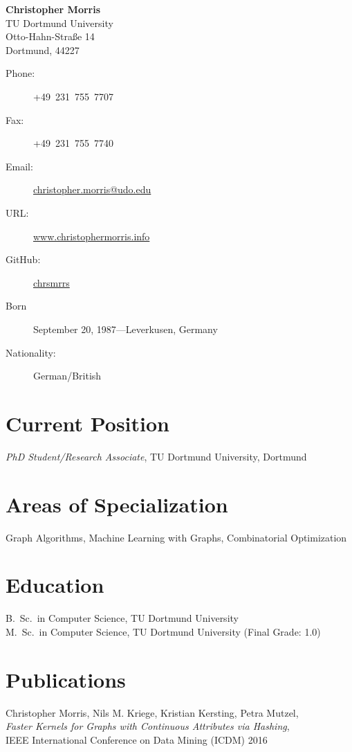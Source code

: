 \documentclass[11pt, a4paper]{scrartcl}
\newcommand{\years}[1]{\marginnote {\bf #1}}
\begin{document}
{\LARGE \bf Christopher Morris}\\[1cm] 
TU Dortmund University\\ 
Otto-Hahn-Stra\ss{}e 14\\
Dortmund, 44227

\begin{description}
	\item[Phone:] 
	+49\ 231~755~7707	
	\item[Fax:] 
	+49~231~755~7740
	\item[Email:] \href{mailto:christopher.morris@udo.edu}{christopher.morris@udo.edu}
	\item[URL:] \href{www.christophermorris.info}{www.christophermorris.info}
	\item[GitHub:] \href{https://github.com/chrsmrrs}{chrsmrrs}
	\item[]
	\item[Born] 
	September 20, 1987---Leverkusen, Germany
	\item[Nationality:] 
	German/British 
\end{description}

\section*{Current Position}
\emph{PhD Student/Research Associate}, TU Dortmund University, Dortmund

\section*{Areas of Specialization}
Graph Algorithms, Machine Learning with Graphs, Combinatorial Optimization

\section*{Education}
\years{2012} B.~Sc.~in Computer Science, TU Dortmund University\\
\years{2015} M.~Sc.~in Computer Science, TU Dortmund University (Final Grade: 1.0) 

\section*{Publications}

\years{2016} Christopher Morris, Nils M. Kriege, Kristian Kersting, Petra Mutzel,\\
\emph{Faster Kernels for Graphs with Continuous Attributes via Hashing},\\
IEEE International Conference on Data Mining (ICDM) 2016\\
\end{document}
